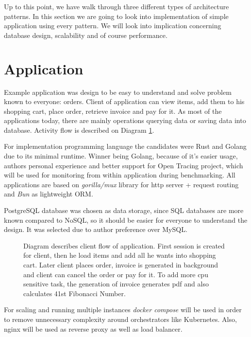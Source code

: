 

Up to this point, we have walk through three different types of architecture patterns. In this section we are going to look into implementation of simple application using every pattern. We will look into implication concerning database design, scalability and of course performance.

\section{Application}
Example application was design to be easy to understand and solve problem known to everyone: orders. Client of application can view items, add them to his shopping cart, place order, retrieve invoice and pay for it. As most of the applications today, there are mainly operations querying data or saving data into database. Activity flow is described on Diagram \ref{img:app_activity_flow}.

For implementation programming language the candidates were Rust and Golang due to its minimal runtime. Winner being Golang, because of it's easier usage, authors personal experience and better support for Open Tracing project, which will be used for monitoring from within application during benchmarking. All applications are based on \textit{gorilla/mux} \cite{MUX} library for http server + request routing and \textit{Bun} \cite{BUN} as lightweight ORM.

PostgreSQL database was chosen as data storage, since SQL databases are more known compared to NoSQL, so it should be easier for everyone to understand the design. It was selected due to author preference over MySQL.
\begin{figure}
    \centering
    
    \caption{Diagram describes client flow of application. First session is created for client, then he load items and add all he wants into shopping cart. Later client places order, invoice is generated in background and client can cancel the order or pay for it. To add more cpu sensitive task, the generation of invoice generates pdf and also calculates 41st Fibonacci Number. \label{img:app_activity_flow}}
\end{figure}

For scaling and running multiple instances \textit{docker compose} will be used in order to remove unnecessary complexity around orchestrators like Kubernetes. Also, nginx will be used as reverse proxy as well as load balancer.

